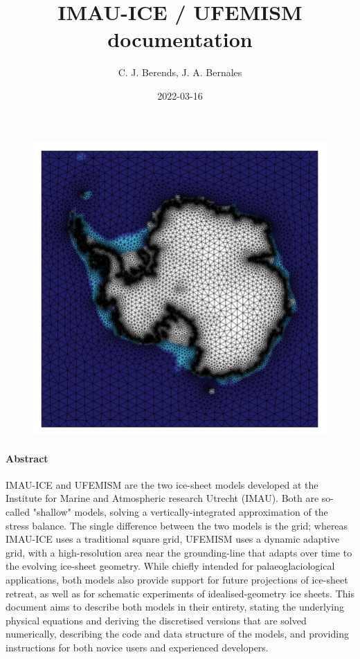 \documentclass{article}
\title{IMAU-ICE / UFEMISM documentation}
\date{2022-03-16}
\author{C. J. Berends, J. A. Bernales}
\begin{document}
  \maketitle

  \begin{figure}[H]
    \centering
    \includegraphics[width=0.8\linewidth]{Fig_UFEMISM.png}
  \end{figure}  

  \paragraph{Abstract}
  
IMAU-ICE and UFEMISM are the two ice-sheet models developed at the Institute for Marine and Atmospheric research Utrecht (IMAU). Both are so-called "shallow" models, solving a vertically-integrated approximation of the stress balance. The single difference between the two models is the grid; whereas IMAU-ICE uses a traditional square grid, UFEMISM uses a dynamic adaptive grid, with a high-resolution area near the grounding-line that adapts over time to the evolving ice-sheet geometry. While chiefly intended for palaeoglaciological applications, both models also provide support for future projections of ice-sheet retreat, as well as for schematic experiments of idealised-geometry ice sheets. This document aims to describe both models in their entirety, stating the underlying physical equations and deriving the discretised versions that are solved numerically, describing the code and data structure of the models, and providing instructions for both novice users and experienced developers.
  
\end{document}
